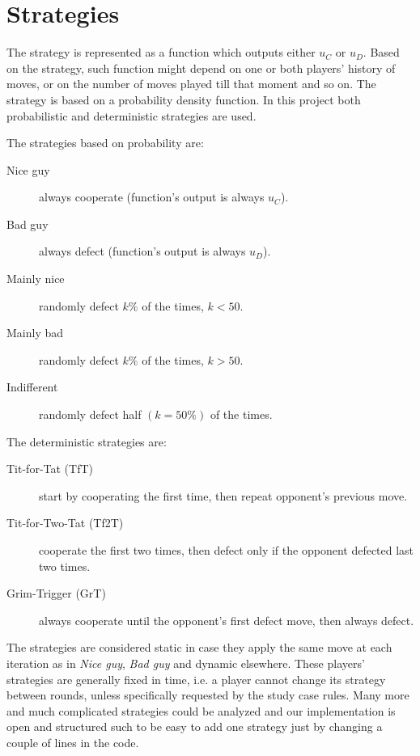 \documentclass[journal,a4paper,10pt,twoside]{IEEEtran} %
\begin{document}
\section{Strategies} \label{s:str}
The strategy is represented as a function which outputs either $u_C$ or $u_D$. Based on the strategy, such function might depend on one or both players' history of moves, or on the number of moves played till that moment and so on.
The strategy is based on a probability density function. In this project both probabilistic and deterministic strategies are used.

The strategies based on probability are:
\begin{description}
    \item[Nice guy] always cooperate (function's output is always $u_C$).
    \item[Bad guy] always defect (function's output is always $u_D$).
    \item[Mainly nice] randomly defect $k\%$ of the times, $k<50$.%
    \item[Mainly bad] randomly defect $k\%$ of the times, $k>50$.%
    \item[Indifferent] randomly defect half $(k=50\%)$ of the times.
\end{description}

The deterministic strategies are:
\begin{description}
    \item[Tit-for-Tat (TfT)] start by cooperating the first time, then repeat opponent's previous move.
    \item[Tit-for-Two-Tat (Tf2T)] cooperate the first two times, then defect only if the opponent defected last two times.
    \item[Grim-Trigger (GrT)] always cooperate until the opponent's first defect move, then always defect. 
\end{description}

The strategies are considered static in case they apply the same move at each iteration as in \textit{Nice guy}, \textit{Bad guy} and dynamic elsewhere.
These players' strategies are generally fixed in time, i.e. a player cannot change its strategy between rounds, unless specifically requested by the study case rules.%
Many more and much complicated strategies could be analyzed and our implementation is open and structured such to be easy to add one strategy just by changing a couple of lines in the code.
\end{document}
